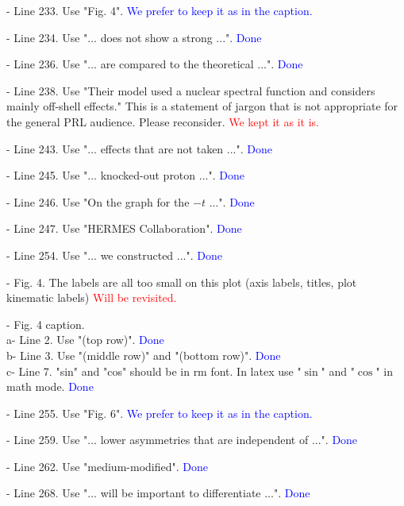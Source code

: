 \documentclass[a4paper,11pt,twoside]{article}
\begin{document}
\begin{enumerate}
- Line 233. Use "Fig. 4".
      \textcolor{blue}{We prefer to keep it as in the caption.}

- Line 234. Use "... does not show a strong ...".
      \textcolor{blue}{Done}

- Line 236. Use "... are compared to the theoretical ...".
      \textcolor{blue}{Done}

- Line 238. Use "Their model used a nuclear spectral function and considers 
   mainly off-shell effects." This is a statement of jargon that is not 
   appropriate for the general PRL audience.  Please reconsider.
      \textcolor{red}{We kept it as it is.}

- Line 243. Use "... effects that are not taken ...".
      \textcolor{blue}{Done}

- Line 245. Use "... knocked-out proton ...".
      \textcolor{blue}{Done}

- Line 246. Use "On the graph for the $-t$ ...".
      \textcolor{blue}{Done}

- Line 247. Use "HERMES Collaboration".
      \textcolor{blue}{Done}

- Line 254. Use "... we constructed ...".
      \textcolor{blue}{Done}

- Fig. 4. The labels are all too small on this plot (axis labels, titles, plot 
  kinematic labels)
      \textcolor{red}{Will be revisited.}

- Fig. 4 caption.\\
   a- Line 2. Use "(top row)".
      \textcolor{blue}{Done}\\
   b- Line 3. Use "(middle row)" and "(bottom row)".
      \textcolor{blue}{Done}\\
   c- Line 7. "sin" and "cos" should be in rm font. In latex use "$\sin$" and 
   "$\cos$" in math mode.
      \textcolor{blue}{Done}

- Line 255. Use "Fig. 6".
      \textcolor{blue}{We prefer to keep it as in the caption.}

- Line 259. Use "... lower asymmetries that are independent of ...".
      \textcolor{blue}{Done}

- Line 262. Use "medium-modified".
      \textcolor{blue}{Done}

- Line 268. Use "... will be important to differentiate ...".
      \textcolor{blue}{Done}


\end{enumerate}
\end{document}
